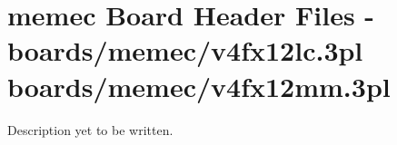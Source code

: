 \pagebreak

\section{memec Board Header Files -\\
            boards/memec/v4fx12lc.3pl\\
            boards/memec/v4fx12mm.3pl}

    Description yet to be written.

